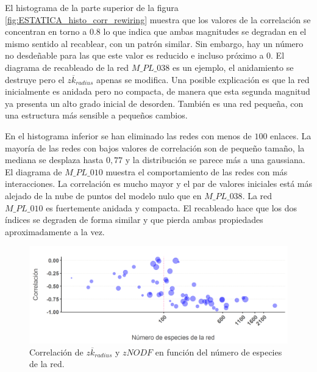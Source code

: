 El histograma de la parte superior de la figura \ref{fig:ESTATICA_histo_corr_rewiring} muestra que los valores de la correlación se concentran en torno a $0.8$ lo que indica que ambas magnitudes se degradan en el mismo sentido al recablear, con un patrón similar. Sin embargo, hay un número no desdeñable para las que este valor es reducido e incluso próximo a $0$. El diagrama de recableado de la red $M\_PL\_038$ es un ejemplo, el anidamiento se destruye pero el $z \overline {k}_{radius}$ apenas se modifica. Una posible explicación es que la red inicialmente es anidada pero no compacta, de manera que
esta segunda magnitud ya presenta un alto grado inicial de desorden. También es una red pequeña, con una estructura más sensible a pequeños cambios.

En el histograma inferior se han eliminado las redes con menos de $100$ enlaces. La mayoría de las redes con bajos valores de correlación son de pequeño tamaño, la mediana se desplaza hasta $0,77$ y la distribución se parece más a una gaussiana. El diagrama de $M\_PL\_010$ muestra el comportamiento de las redes con más interacciones. La correlación es mucho mayor y el par de valores iniciales está más alejado de la nube de puntos del modelo nulo que en $M\_PL\_038$. La red $M\_PL\_010$ es fuertemente anidada y compacta. El recableado hace que los dos índices se degraden de forma similar y que pierda ambas propiedades aproximadamente a la vez.

\begin{figure}[h!]
\centering
\includegraphics[scale=0.6]{Figures/ESTATITCA_asimetria_corr.png}
\caption {Correlación de $z \overline {k}_{radius}$ y $zNODF$ en función del número de especies de la red.}
\label{fig:ESTATICA_asimetria_corr}
\end{figure}

